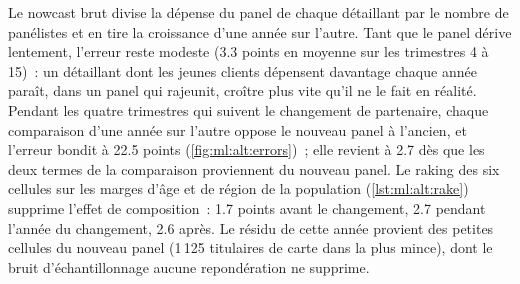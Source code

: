 Le nowcast brut divise la dépense du panel de chaque détaillant par le nombre de panélistes et en tire la croissance d'une année sur l'autre. Tant que
le panel dérive lentement, l'erreur reste modeste (3.3 points en moyenne sur les trimestres 4 à 15)~: un détaillant dont les jeunes clients
dépensent davantage chaque année paraît, dans un panel qui rajeunit, croître plus vite qu'il ne le fait en réalité. Pendant les quatre trimestres qui suivent le
changement de partenaire, chaque comparaison d'une année sur l'autre oppose le nouveau panel à l'ancien, et l'erreur bondit à 22.5 points
(\cref{fig:ml:alt:errors})~; elle revient à 2.7 dès que les deux termes de la comparaison proviennent du nouveau panel. Le raking des six cellules
sur les marges d'âge et de région de la population (\cref{lst:ml:alt:rake}) supprime l'effet de composition~: 1.7 points avant le
changement, 2.7 pendant l'année du changement, 2.6 après. Le résidu de cette année provient des petites cellules du nouveau panel (1\,125
titulaires de carte dans la plus mince), dont le bruit d'échantillonnage aucune repondération ne supprime.

\begin{omfigure}

\label{fig:ml:alt:errors}
\end{omfigure}

